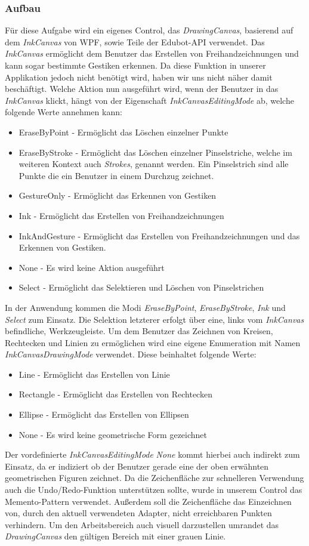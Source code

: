 \subsubsection{Aufbau}
Für diese Aufgabe wird ein eigenes Control, das \textit{DrawingCanvas}, basierend auf dem \textit{InkCanvas} von WPF, sowie Teile der Edubot-API verwendet. Das \textit{InkCanvas} ermöglicht dem Benutzer das Erstellen von Freihandzeichnungen und kann sogar bestimmte Gestiken erkennen. Da diese Funktion in unserer Applikation jedoch nicht benötigt wird, haben wir uns nicht näher damit beschäftigt. Welche Aktion nun ausgeführt wird, wenn der Benutzer in das \textit{InkCanvas} klickt, hängt von der Eigenschaft \textit{InkCanvasEditingMode} ab, welche folgende Werte annehmen kann:
\begin{itemize}
\item EraseByPoint - Ermöglicht das Löschen einzelner Punkte
\item EraseByStroke - Ermöglicht das Löschen einzelner Pinselstriche, welche im weiteren Kontext auch \textit{Strokes}, genannt werden. Ein Pinselstrich sind alle Punkte die ein Benutzer in einem Durchzug zeichnet.
\item GestureOnly - Ermöglicht das Erkennen von Gestiken
\item Ink - Ermöglicht das Erstellen von Freihandzeichnungen
\item InkAndGesture - Ermöglicht das Erstellen von Freihandzeichnungen und das Erkennen von Gestiken.
\item None - Es wird keine Aktion ausgeführt
\item Select - Ermöglicht das Selektieren und Löschen von Pinselstrichen
\end{itemize}
In der Anwendung kommen die Modi \textit{EraseByPoint}, \textit{EraseByStroke}, \textit{Ink} und \textit{Select} zum Einsatz. Die Selektion letzterer erfolgt über eine, links vom \textit{InkCanvas} befindliche, Werkzeugleiste. Um dem Benutzer das Zeichnen von Kreisen, Rechtecken und Linien zu ermöglichen wird eine eigene Enumeration mit Namen \textit{InkCanvasDrawingMode} verwendet. Diese beinhaltet folgende Werte:
\begin{itemize}
\item Line - Ermöglicht das Erstellen von Linie
\item Rectangle - Ermöglicht das Erstellen von Rechtecken
\item Ellipse - Ermöglicht das Erstellen von Ellipsen
\item None - Es wird keine geometrische Form gezeichnet
\end{itemize}
Der vordefinierte \textit{InkCanvasEditingMode} \textit{None} kommt hierbei auch indirekt zum Einsatz, da er indiziert ob der Benutzer gerade eine der oben erwähnten geometrischen Figuren zeichnet. 
Da die Zeichenfläche zur schnelleren Verwendung auch die Undo/Redo-Funktion unterstützen sollte, wurde in unserem Control das Memento-Pattern verwendet. Außerdem soll die Zeichenfläche das Einzeichnen von, durch den aktuell verwendeten Adapter, nicht erreichbaren Punkten verhindern. Um den Arbeitsbereich auch visuell darzustellen umrandet das \textit{DrawingCanvas} den gültigen Bereich mit einer grauen Linie.

